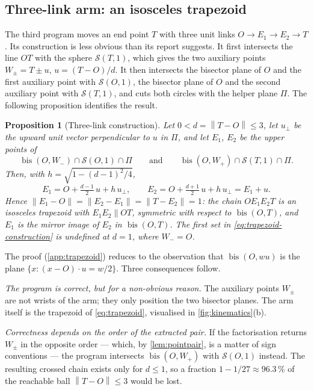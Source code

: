 \documentclass[11pt,a4paper]{article}
\theoremstyle{plain}
\newtheorem{proposition}{Proposition}
\theoremstyle{definition}
\theoremstyle{remark}
\newcommand{\norm}[1]{\left\lVert#1\right\rVert}
\newcommand{\bis}{\operatorname{bis}}
\newcommand{\Sph}{\mathcal{S}}
\begin{document}
\subsection{Three-link arm: an isosceles trapezoid}\label{sec:threelink}

The third program moves an end point $T$ with three unit links $O\to E_1\to
E_2\to T$. Its construction is less obvious than its report suggests. It first
intersects the line $OT$ with the sphere $\Sph(T,1)$, which gives the two
auxiliary points $W_\pm=T\pm u$, $u=(T-O)/d$. It then intersects the bisector
plane of $O$ and the first auxiliary point with $\Sph(O,1)$, the bisector plane
of $O$ and the second auxiliary point with $\Sph(T,1)$, and cuts both circles
with the helper plane $\Pi$. The following proposition identifies the result.

\begin{proposition}[Three-link construction]\label{prop:trapezoid}
Let $0<d=\norm{T-O}\le 3$, let $u_\perp$ be the upward unit vector perpendicular
to $u$ in $\Pi$, and let $E_1$, $E_2$ be the upper points of
\begin{equation}
  \bis(O,W_-)\cap\Sph(O,1)\cap\Pi
  \qquad\text{and}\qquad
  \bis(O,W_+)\cap\Sph(T,1)\cap\Pi .
  \label{eq:trapezoid-construction}
\end{equation}
Then, with $h=\sqrt{1-(d-1)^2/4}$,
\begin{equation}
  E_1=O+\tfrac{d-1}{2}\,u+h\,u_\perp,
  \qquad
  E_2=O+\tfrac{d+1}{2}\,u+h\,u_\perp=E_1+u .
  \label{eq:trapezoid}
\end{equation}
Hence $\norm{E_1-O}=\norm{E_2-E_1}=\norm{T-E_2}=1$: the chain $OE_1E_2T$ is an
isosceles trapezoid with $E_1E_2\parallel OT$, symmetric with respect to
$\bis(O,T)$, and $E_1$ is the mirror image of $E_2$ in $\bis(O,T)$. The first
set in \cref{eq:trapezoid-construction} is undefined at $d=1$, where $W_-=O$.
\end{proposition}

The proof (\cref{app:trapezoid}) reduces to the observation that $\bis(O,wu)$
is the plane $\{x:(x-O)\cdot u=w/2\}$. Three consequences follow.

\emph{The program is correct, but for a non-obvious reason.} The auxiliary
points $W_\pm$ are not wrists of the arm; they only position the two bisector
planes. The arm itself is the trapezoid of \cref{eq:trapezoid}, visualised in
\cref{fig:kinematics}(b).

\emph{Correctness depends on the order of the extracted pair.} If the
factorisation returns $W_\pm$ in the opposite order --- which, by
\cref{lem:pointpair}, is a matter of sign conventions --- the program intersects
$\bis(O,W_+)$ with $\Sph(O,1)$ instead. The resulting crossed chain exists only
for $d\le1$, so a fraction $1-1/27\approx96.3\,\%$ of the reachable ball
$\norm{T-O}\le3$ would be lost.
\end{document}
